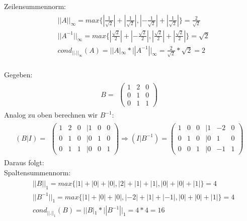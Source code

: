 Zeilensummennorm:
\begin{align*}
\begin{split}
&||A||_\infty =max\{|\frac{1}{\sqrt2}|+|\frac{1}{\sqrt2}|, |-\frac{1}{\sqrt2}|+|\frac{1}{\sqrt2}|\}=\frac{2}{\sqrt2}\\
&||A^{-1}||_\infty=max\{|\frac{\sqrt2}{2}|+|-\frac{\sqrt2}{2}|, |\frac{\sqrt2}{2}|+|\frac{\sqrt2}{2}|\}={\sqrt2}\\
& cond_{||.||_\infty}(A)=||A|_\infty*||A^{-1}||_\infty=\frac{2}{\sqrt2} * {\sqrt2} = 2\\
\end{split}
\end{align*}
\newline


Gegeben:\\
\begin{align*} 
B=
\begin{split}
\begin{pmatrix}
1 & 2 & 0 \\
0 & 1 & 0 \\
0 & 1 & 1
\end{pmatrix}
\end{split}
\end{align*}
Analog zu oben berechnen wir $B^{-1}$:\\
\begin{align*}
(B|I)=
\begin{split}
\begin{pmatrix}
1 & 2 & 0 & |1 & 0 & 0\\
0 & 1 & 0 & |0 & 1 & 0\\
0 & 1 & 1 & |0 & 0 & 1
\end{pmatrix}
\Rightarrow(I|B^{-1})=
\begin{pmatrix}
1 & 0 & 0 &|1 & -2 & 0 \\
0 & 1 & 0 &|0 & 1 & 0 \\
0 & 0 & 1 &|0 & -1 & 1  
\end{pmatrix}
\end{split}
\end{align*}
Daraus folgt:\\
Spaltensummennorm:
\begin{align*}
\begin{split}
&||B||_1=max\{|1|+|0|+|0|, |2|+|1|+|1|, |0|+|0|+|1|\} = 4\\
&||B^{-1}||_1=max\{|1|+|0|+|0|, |-2|+|1|+|-1|, |0|+|0|+|1|\} = 4\\
& cond_{||.||_1}(B)=||B|_1*||B^{-1}||_1= 4 * 4 = 16\\
\end{split}
\end{align*}
